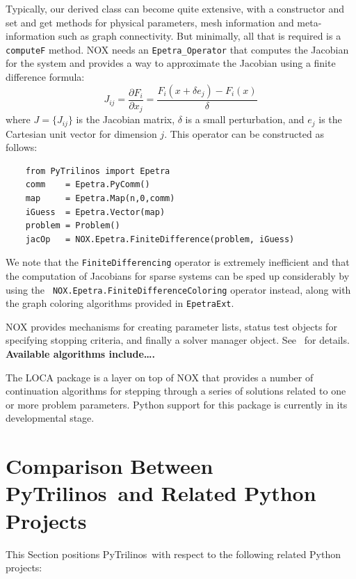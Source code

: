 \documentclass[acmtocl]{acmtrans2m}
\newcommand{\PyTrilinos}{{PyTrilinos}}
\begin{document}
Typically, our derived class can become quite extensive, with a
constructor and set and get methods for physical parameters, mesh
information and meta-information such as graph connectivity.  But
minimally, all that is required is a {\tt computeF} method.  NOX needs
an {\tt Epetra\_Operator} that computes the Jacobian for the system
and provides a way to approximate the Jacobian using a finite
difference formula:
\begin{equation}
  J_{ij} = \frac{\partial F_i}{\partial x_j} = \frac{F_i(x+\delta e_j)
    - F_i(x)}{\delta}
\end{equation}
where $J=\{J_{ij}\}$ is the Jacobian matrix, $\delta$ is a small
perturbation, and $e_j$ is the Cartesian unit vector for dimension
$j$.  This operator can be constructed as follows:
\begin{verbatim}
    from PyTrilinos import Epetra
    comm    = Epetra.PyComm()
    map     = Epetra.Map(n,0,comm)
    iGuess  = Epetra.Vector(map)
    problem = Problem()
    jacOp   = NOX.Epetra.FiniteDifference(problem, iGuess)
\end{verbatim}
We note that the {\tt FiniteDifferencing} operator is extremely
inefficient and that the computation of Jacobians for sparse systems
can be sped up considerably by using the {\tt
  NOX.Epetra.FiniteDifferenceColoring} operator instead, along with
the graph coloring algorithms provided in {\tt EpetraExt}.

NOX provides mechanisms for creating parameter lists, status test
objects for specifying stopping criteria, and finally a solver manager
object.  See~\cite{Pawlowski} for details.  {\bf Available algorithms
  include\ldots.}

The LOCA package is a layer on top of NOX that provides a number of
continuation algorithms for stepping through a series of solutions
related to one or more problem parameters.  Python support for this
package is currently in its developmental stage.

\section{Comparison Between \PyTrilinos\ and Related Python Projects}
\label{sec:comparison_python}

This Section positions \PyTrilinos\ with respect to the following
related Python projects:
\end{document}
